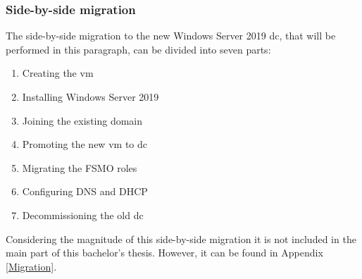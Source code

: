 \subsubsection{Side-by-side migration}
\label{sssec:Side-by-side_migration}
The side-by-side migration to the new Windows Server 2019 \acrshort{dc}, that will be performed in this paragraph, can be divided into seven parts:
\begin{enumerate}
	\item Creating the \acrshort{vm}
	\item Installing Windows Server 2019
	\item Joining the existing domain
	\item Promoting the new \acrshort{vm} to \acrshort{dc}
	\item Migrating the FSMO roles
	\item Configuring DNS and DHCP
	\item Decommissioning the old \acrshort{dc} 
\end{enumerate}
Considering the magnitude of this side-by-side migration it is not included in the main part of this bachelor's thesis. 
However, it can be found in Appendix \ref{Migration}. 

